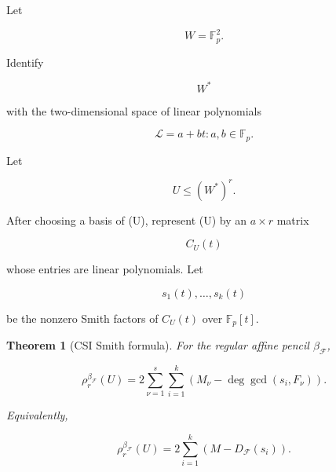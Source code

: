\documentclass[11pt]{article}
\newtheorem{theorem}{Theorem}[section]
\begin{document}
Let

\[
W=\mathbb F_p^2.
\]

Identify

\[
W^*
\]

with the two-dimensional space of linear polynomials

\[
\mathcal L={a+bt:a,b\in\mathbb F_p}.
\]

Let

\[
U\le (W^*)^r.
\]

After choosing a basis of (U), represent (U) by an $a\times r$ matrix

\[
C_U(t)
\]

whose entries are linear polynomials. Let

\[
s_1(t),\ldots,s_k(t)
\]

be the nonzero Smith factors of $C_U(t)$ over $\mathbb F_p[t]$.

\begin{theorem}[CSI Smith formula]
For the regular affine pencil $\beta_{\mathcal F}$,

\[
\boxed{
\rho_r^{\beta_{\mathcal F}}(U)
=2\sum_{\nu=1}^s
\sum_{i=1}^k
\left(
M_\nu-\deg\gcd(s_i,F_\nu)
\right).
}
\tag{6.1}
\]

Equivalently,

\[
\boxed{
\rho_r^{\beta_{\mathcal F}}(U)
=2\sum_{i=1}^k
\left(
M-D_{\mathcal F}(s_i)
\right).
}
\tag{6.2}
\]

\end{theorem}
\end{document}

